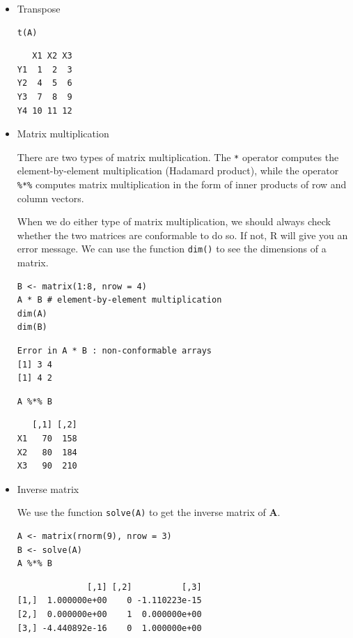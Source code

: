 \documentclass[a4paper,11pt]{article}
\begin{document}
\begin{itemize}
\item Transpose
\label{sec:org73b6b9f}

\begin{verbatim}
t(A)
\end{verbatim}

\begin{verbatim}
   X1 X2 X3
Y1  1  2  3
Y2  4  5  6
Y3  7  8  9
Y4 10 11 12
\end{verbatim}

\item Matrix multiplication
\label{sec:org3f88bf5}

There are two types of matrix multiplication. The \texttt{*} operator
computes the element-by-element multiplication (Hadamard product),
while the operator \texttt{\%*\%} computes matrix multiplication in the form of
inner products of row and column vectors.

When we do either type of matrix multiplication, we should always
check whether the two matrices are conformable to do so. If not, R
will give you an error message. We can use the function \texttt{dim()} to see
the dimensions of a matrix.

\begin{verbatim}
B <- matrix(1:8, nrow = 4)
A * B # element-by-element multiplication
dim(A)
dim(B)
\end{verbatim}

\begin{verbatim}
Error in A * B : non-conformable arrays
[1] 3 4
[1] 4 2
\end{verbatim}

\begin{verbatim}
A %*% B
\end{verbatim}

\begin{verbatim}
   [,1] [,2]
X1   70  158
X2   80  184
X3   90  210
\end{verbatim}

\item Inverse matrix
\label{sec:orgd921156}

We use the function \texttt{solve(A)} to get the inverse matrix of
\(\mathbf{A}\).

\begin{verbatim}
A <- matrix(rnorm(9), nrow = 3)
B <- solve(A)
A %*% B
\end{verbatim}

\begin{verbatim}
              [,1] [,2]          [,3]
[1,]  1.000000e+00    0 -1.110223e-15
[2,]  0.000000e+00    1  0.000000e+00
[3,] -4.440892e-16    0  1.000000e+00
\end{verbatim}


\end{itemize}
\end{document}
